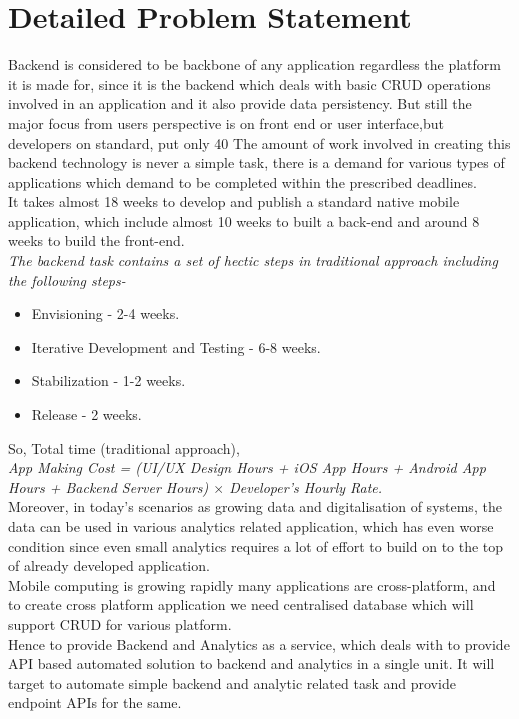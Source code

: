 \documentclass[a4paper,12pt]{report}
\begin{document}
    \section{Detailed Problem Statement}
    \label{sec:theory}
    Backend is considered to be backbone of any application regardless the platform it is made for, since it is the backend which deals with basic CRUD operations involved in an application and it also provide data persistency. But still the major focus from users perspective is on front end or user interface,but developers on standard, put only 40%
    The amount of work involved in creating this backend technology is never a simple task, there is a demand for various types of applications which demand to be completed within the prescribed deadlines. \\
    It takes almost 18 weeks to develop and publish a standard native mobile application, which include almost 10 weeks to built a back-end and around 8 weeks to build the front-end.\\    
    \emph { The backend task contains a set of hectic steps in traditional approach including the following steps- }
    \begin{itemize}
      \item {Envisioning - 2-4 weeks. }
      \item {Iterative Development and Testing - 6-8 weeks. }
      \item {Stabilization - 1-2 weeks.}
      \item {Release - 2 weeks. }
    \end{itemize}    
    So, Total time (traditional approach), \\
    \emph{
      App Making Cost = (UI/UX Design Hours + iOS App Hours + Android App Hours + Backend Server Hours)
      $ \times $ Developer’s Hourly Rate.
        } \\
    Moreover, in today’s scenarios as growing data and digitalisation of systems, the data can be used in various analytics related application, which has even worse condition since even small analytics requires a lot of effort to build on to the top of already developed application.\\    
    Mobile computing is growing rapidly many applications are cross-platform, and to create cross platform application we need centralised database which will support CRUD for various platform.\\
    Hence to provide Backend and Analytics as a service, which deals with to provide API based automated solution to backend and analytics in a single unit. It will target to automate simple backend and analytic related task and provide endpoint APIs for the same.\\    
\end{document}
